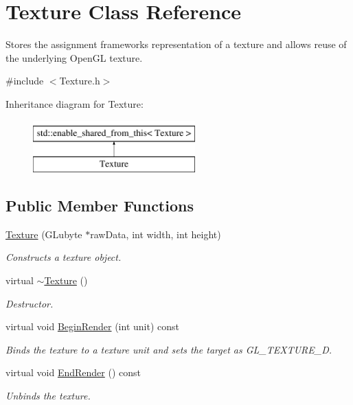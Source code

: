 \hypertarget{class_texture}{}\section{Texture Class Reference}
\label{class_texture}


Stores the assignment framework\textquotesingle{}s representation of a texture and allows reuse of the underlying Open\+G\+L texture.  




{\ttfamily \#include $<$Texture.\+h$>$}

Inheritance diagram for Texture\+:\begin{figure}[H]
\begin{center}
\leavevmode
\includegraphics[height=2.000000cm]{class_texture}
\end{center}
\end{figure}
\subsection*{Public Member Functions}
\begin{DoxyCompactItemize}
\item 
\hyperlink{class_texture_ad2772674616f4956ba602d0853ca5585}{Texture} (G\+Lubyte $\ast$raw\+Data, int width, int height)
\begin{DoxyCompactList}\small\item\em Constructs a texture object. \end{DoxyCompactList}\item 
virtual \hyperlink{class_texture_a09c4bcb7462f64c1d20fa69dba3cee8a}{$\sim$\+Texture} ()
\begin{DoxyCompactList}\small\item\em Destructor. \end{DoxyCompactList}\item 
virtual void \hyperlink{class_texture_a2da54ce7444fbc74beccb8d17283be7e}{Begin\+Render} (int unit) const 
\begin{DoxyCompactList}\small\item\em Binds the texture to a texture unit and sets the target as G\+L\+\_\+\+T\+E\+X\+T\+U\+R\+E\+\_\+D. \end{DoxyCompactList}\item 
virtual void \hyperlink{class_texture_a8e6ec1266ead2dcd262b025f90e99838}{End\+Render} () const 
\begin{DoxyCompactList}\small\item\em Unbinds the texture. \end{DoxyCompactList}\end{DoxyCompactItemize}
